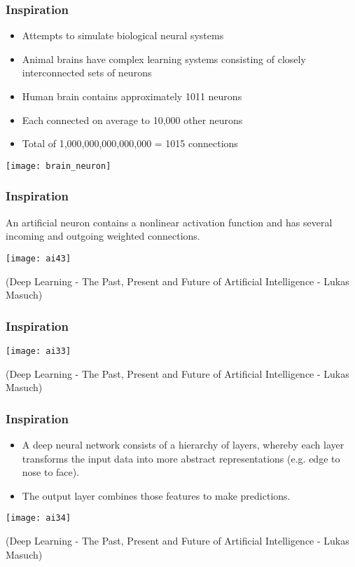\begin{frame}[fragile] \frametitle{Inspiration}

\begin{itemize}
\item Attempts to simulate biological neural systems
\item  Animal brains have complex learning systems consisting of closely interconnected sets of neurons
\item  Human brain contains approximately 1011 neurons
\item  Each connected on average to 10,000 other neurons
\item  Total of 1,000,000,000,000,000 = 1015 connections
\end{itemize}

\begin{center}
\texttt{[image: brain\_neuron]}
\end{center}

\end{frame}

\begin{frame}[fragile] \frametitle{Inspiration}
An artificial neuron contains a nonlinear activation function and has several
incoming and outgoing weighted connections. 
\begin{center}
\texttt{[image: ai43]}
\end{center}
{\tiny (Deep Learning - The Past, Present and Future of Artificial Intelligence - Lukas Masuch)}
\end{frame}


\begin{frame}[fragile] \frametitle{Inspiration}
\begin{center}
\texttt{[image: ai33]}
\end{center}
{\tiny (Deep Learning - The Past, Present and Future of Artificial Intelligence - Lukas Masuch)}
\end{frame}

\begin{frame}[fragile] \frametitle{Inspiration}
\begin{itemize}
\item A deep neural network consists of a hierarchy of layers, whereby each layer
transforms the input data into more abstract representations (e.g. edge to
nose to face). 
\item The output layer combines those features to make predictions.
\end{itemize}
\begin{center}
\texttt{[image: ai34]}
\end{center}
{\tiny (Deep Learning - The Past, Present and Future of Artificial Intelligence - Lukas Masuch)}
\end{frame}

